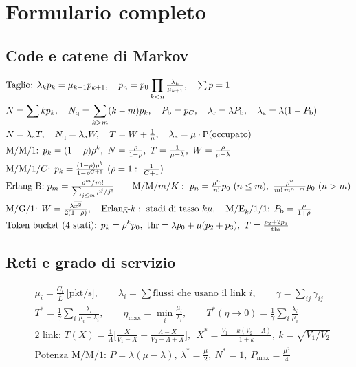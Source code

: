 \chapter{Formulario completo}
\small
\section*{Code e catene di Markov}
\begin{align*}
&\text{Taglio: } \lambda_kp_k=\mu_{k+1}p_{k+1},\quad p_n=p_0\prod_{k<n}\tfrac{\lambda_k}{\mu_{k+1}},\quad \textstyle\sum p=1\\
&N=\sum kp_k,\quad \Nq=\sum_{k>m}(k-m)p_k,\quad \Pb=p_C,\quad \lr=\lambda\Pb,\quad \la=\lambda(1-\Pb)\\
&N=\la T,\quad \Nq=\la W,\quad T=W+\tfrac1\mu,\quad \la=\mu\cdot\Pr(\text{occupato})\\
&\text{M/M/1: } p_k=(1-\rho)\rho^k,\ N=\tfrac\rho{1-\rho},\ T=\tfrac1{\mu-\lambda},\ W=\tfrac{\rho}{\mu-\lambda}\\
&\text{M/M/1/}C\text{: } p_k=\tfrac{(1-\rho)\rho^k}{1-\rho^{C+1}}\ (\rho=1:\ \tfrac1{C+1})\\
&\text{Erlang B: } p_m=\tfrac{\rho^m/m!}{\sum_{j\le m}\rho^j/j!}\qquad
\text{M/M/}m\text{/}K:\ p_n=\tfrac{\rho^n}{n!}p_0\ (n\le m),\ \tfrac{\rho^n}{m!\,m^{n-m}}p_0\ (n>m)\\
&\text{M/G/1: } W=\tfrac{\lambda\overline{x^2}}{2(1-\rho)},\quad \text{Erlang-}k:\ \text{stadi di tasso }k\mu,\quad \text{M/E}_k\text{/1/1: }\Pb=\tfrac{\rho}{1+\rho}\\
&\text{Token bucket (4 stati): } p_k=\rho^kp_0,\ \text{thr}=\lambda p_0+\mu(p_2+p_3),\ T=\tfrac{p_2+2p_3}{\text{thr}}
\end{align*}

\section*{Reti e grado di servizio}
\begin{align*}
&\mu_i=\tfrac{C_i}{\bar L}\ \text{[pkt/s]},\qquad \lambda_i=\textstyle\sum\text{flussi che usano il link }i,\qquad \gamma=\sum_{ij}\gamma_{ij}\\
&T^*=\tfrac1\gamma\sum_i\tfrac{\lambda_i}{\mu_i-\lambda_i},\qquad \eta_{\max}=\min_i\tfrac{\mu_i}{\lambda_i},\qquad T^*(\eta\to0)=\tfrac1\gamma\sum_i\tfrac{\lambda_i}{\mu_i}\\
&\text{2 link: }T(X)=\tfrac1\Lambda\Big[\tfrac{X}{V_1-X}+\tfrac{\Lambda-X}{V_2-\Lambda+X}\Big],\ \ X^*=\tfrac{V_1-k(V_2-\Lambda)}{1+k},\ k=\sqrt{V_1/V_2}\\
&\text{Potenza M/M/1: }P=\lambda(\mu-\lambda),\ \lambda^*=\tfrac\mu2,\ N^*=1,\ P_{\max}=\tfrac{\mu^2}{4}
\end{align*}

